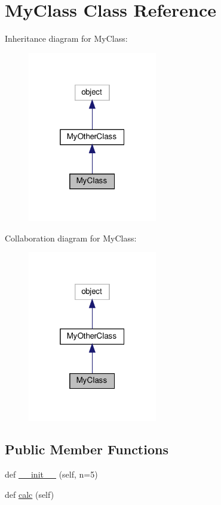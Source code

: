 \hypertarget{classsrc_1_1my__class_1_1MyClass}{}\section{My\+Class Class Reference}
\label{classsrc_1_1my__class_1_1MyClass}


Inheritance diagram for My\+Class\+:\nopagebreak
\begin{figure}[H]
\begin{center}
\leavevmode
\includegraphics[width=160pt]{classsrc_1_1my__class_1_1MyClass__inherit__graph}
\end{center}
\end{figure}


Collaboration diagram for My\+Class\+:\nopagebreak
\begin{figure}[H]
\begin{center}
\leavevmode
\includegraphics[width=160pt]{classsrc_1_1my__class_1_1MyClass__coll__graph}
\end{center}
\end{figure}
\subsection*{Public Member Functions}
\begin{DoxyCompactItemize}
\item 
def \hyperlink{classsrc_1_1my__class_1_1MyClass_a01f7e43ceaf00de636b0e2fa32459c80}{\+\_\+\+\_\+init\+\_\+\+\_\+} (self, n=5)
\item 
def \hyperlink{classsrc_1_1my__class_1_1MyClass_af06166582a4454b37fc37239d03ec7da}{calc} (self)
\end{DoxyCompactItemize}
